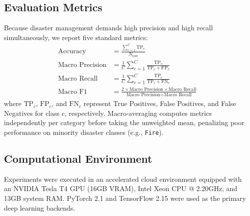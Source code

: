 \documentclass[11pt,a4paper]{article}
\begin{document}
\subsection{Evaluation Metrics}
Because disaster management demands high precision and high recall simultaneously, we report five standard metrics:
\begin{align}
\text{Accuracy} &= \frac{\sum_{c=1}^C \text{TP}_c}{N_{\text{test}}} \\
\text{Macro Precision} &= \frac{1}{C} \sum_{c=1}^C \frac{\text{TP}_c}{\text{TP}_c + \text{FP}_c} \\
\text{Macro Recall} &= \frac{1}{C} \sum_{c=1}^C \frac{\text{TP}_c}{\text{TP}_c + \text{FN}_c} \\
\text{Macro F1} &= \frac{2 \times \text{Macro Precision} \times \text{Macro Recall}}{\text{Macro Precision} + \text{Macro Recall}}
\end{align}
where $\text{TP}_c$, $\text{FP}_c$, and $\text{FN}_c$ represent True Positives, False Positives, and False Negatives for class $c$, respectively. Macro-averaging computes metrics independently per category before taking the unweighted mean, penalizing poor performance on minority disaster classes (e.g., \texttt{Fire}).

\subsection{Computational Environment}
Experiments were executed in an accelerated cloud environment equipped with an NVIDIA Tesla T4 GPU (16GB VRAM), Intel Xeon CPU @ 2.20GHz, and 13GB system RAM. PyTorch 2.1 and TensorFlow 2.15 were used as the primary deep learning backends.
\end{document}
